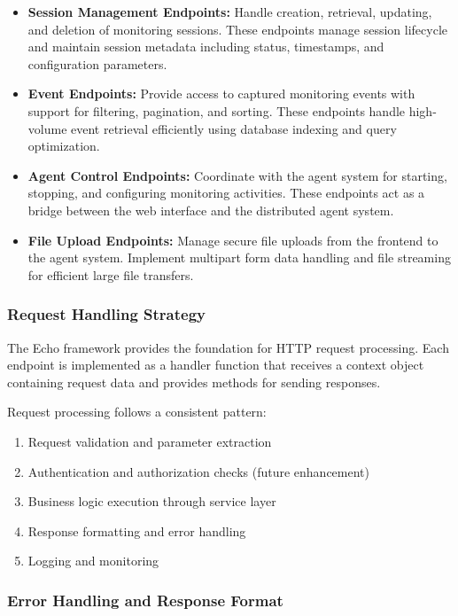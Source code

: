 \begin{itemize}
    \item \textbf{Session Management Endpoints:} Handle creation, retrieval, updating, and deletion of monitoring sessions. These endpoints manage session lifecycle and maintain session metadata including status, timestamps, and configuration parameters.
    
    \item \textbf{Event Endpoints:} Provide access to captured monitoring events with support for filtering, pagination, and sorting. These endpoints handle high-volume event retrieval efficiently using database indexing and query optimization.
    
    \item \textbf{Agent Control Endpoints:} Coordinate with the agent system for starting, stopping, and configuring monitoring activities. These endpoints act as a bridge between the web interface and the distributed agent system.
    
    \item \textbf{File Upload Endpoints:} Manage secure file uploads from the frontend to the agent system. Implement multipart form data handling and file streaming for efficient large file transfers.
\end{itemize}

\subsubsection{Request Handling Strategy}

The Echo framework provides the foundation for HTTP request processing. Each endpoint is implemented as a handler function that receives a context object containing request data and provides methods for sending responses.

Request processing follows a consistent pattern:
\begin{enumerate}
    \item Request validation and parameter extraction
    \item Authentication and authorization checks (future enhancement)
    \item Business logic execution through service layer
    \item Response formatting and error handling
    \item Logging and monitoring
\end{enumerate}

\subsubsection{Error Handling and Response Format}

